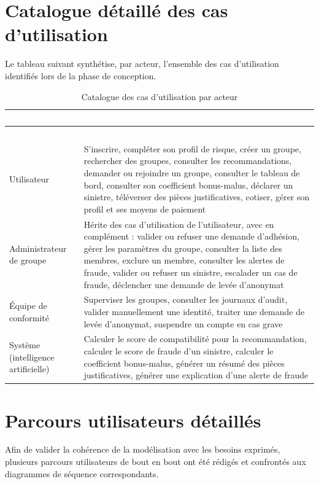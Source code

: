 \documentclass[12pt,a4paper]{report}
\begin{document}
\section{Catalogue détaillé des cas d'utilisation}
Le tableau suivant synthétise, par acteur, l'ensemble des cas d'utilisation identifiés lors de la phase de conception.

\begin{longtable}{p{3.5cm}p{9.5cm}}
\caption{Catalogue des cas d'utilisation par acteur}
\label{tab:catalogue-uc} \\
\rowcolor{tablehead}
\textcolor{white}{\textbf{Acteur}} & \textcolor{white}{\textbf{Cas d'utilisation}} \\
\toprule
\endfirsthead
\rowcolor{tablehead}
\textcolor{white}{\textbf{Acteur}} & \textcolor{white}{\textbf{Cas d'utilisation}} \\
\toprule
\endhead
Utilisateur & S'inscrire, compléter son profil de risque, créer un groupe, rechercher des groupes, consulter les recommandations, demander ou rejoindre un groupe, consulter le tableau de bord, consulter son coefficient bonus-malus, déclarer un sinistre, téléverser des pièces justificatives, cotiser, gérer son profil et ses moyens de paiement \\
Administrateur de groupe & Hérite des cas d'utilisation de l'utilisateur, avec en complément : valider ou refuser une demande d'adhésion, gérer les paramètres du groupe, consulter la liste des membres, exclure un membre, consulter les alertes de fraude, valider ou refuser un sinistre, escalader un cas de fraude, déclencher une demande de levée d'anonymat \\
Équipe de conformité & Superviser les groupes, consulter les journaux d'audit, valider manuellement une identité, traiter une demande de levée d'anonymat, suspendre un compte en cas grave \\
Système (intelligence artificielle) & Calculer le score de compatibilité pour la recommandation, calculer le score de fraude d'un sinistre, calculer le coefficient bonus-malus, générer un résumé des pièces justificatives, générer une explication d'une alerte de fraude \\
\bottomrule
\end{longtable}

\section{Parcours utilisateurs détaillés}
Afin de valider la cohérence de la modélisation avec les besoins exprimés, plusieurs parcours utilisateurs de bout en bout ont été rédigés et confrontés aux diagrammes de séquence correspondants.
\end{document}
